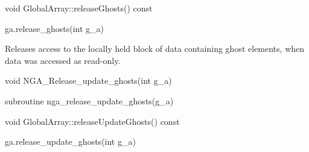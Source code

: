 \documentclass[10pt]{article}
\begin{document}
\begin{cxxapi}
\begin{cxxcode}
void GlobalArray::releaseGhosts() const
\end{cxxcode}
\end{cxxapi}

\begin{pyapi}
\begin{pycode}
ga.release_ghosts(int g_a)
\end{pycode}
\begin{funcargs}
\end{funcargs}
\end{pyapi}

\local

\begin{desc}

Releases access to the locally held block of data containing ghost elements,
when data was accessed as read-only.

\end{desc}



\begin{capi}
\begin{ccode}
void NGA_Release_update_ghosts(int g_a)
\end{ccode}
\begin{funcargs}
\end{funcargs}
\end{capi}

\begin{fapi}
\begin{fcode}
subroutine nga_release_update_ghosts(g_a)
\end{fcode}
\begin{funcargs}
\end{funcargs}
\end{fapi}

\begin{cxxapi}
\begin{cxxcode}
void GlobalArray::releaseUpdateGhosts() const
\end{cxxcode}
\end{cxxapi}

\begin{pyapi}
\begin{pycode}
ga.release_update_ghosts(int g_a)
\end{pycode}
\begin{funcargs}
\end{funcargs}
\end{pyapi}
\end{document}
